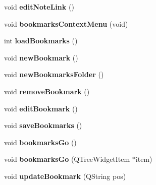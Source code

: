 \begin{CompactItemize}
\item 
\hypertarget{classMainWindow_c3c2f71fe7236fde6c66a2a17a0f436f}{
void \textbf{editNoteLink} ()}
\label{classMainWindow_c3c2f71fe7236fde6c66a2a17a0f436f}

\item 
\hypertarget{classMainWindow_15c3b4f714a9c23fd2482a256005da8e}{
void \textbf{bookmarksContextMenu} (void)}
\label{classMainWindow_15c3b4f714a9c23fd2482a256005da8e}

\item 
\hypertarget{classMainWindow_0ef5dfef86411bcec1be0a3bca710868}{
int \textbf{loadBookmarks} ()}
\label{classMainWindow_0ef5dfef86411bcec1be0a3bca710868}

\item 
\hypertarget{classMainWindow_db2f9dff1d3282e1e1fcdb17bfe773fa}{
void \textbf{newBookmark} ()}
\label{classMainWindow_db2f9dff1d3282e1e1fcdb17bfe773fa}

\item 
\hypertarget{classMainWindow_1e055eddbbaf3b67ad9a0fd19f11cf60}{
void \textbf{newBookmarksFolder} ()}
\label{classMainWindow_1e055eddbbaf3b67ad9a0fd19f11cf60}

\item 
\hypertarget{classMainWindow_c6f9c0e9ccfbad14d6daa68ec9521430}{
void \textbf{removeBookmark} ()}
\label{classMainWindow_c6f9c0e9ccfbad14d6daa68ec9521430}

\item 
\hypertarget{classMainWindow_772698c4d48a78e2467808cee064f140}{
void \textbf{editBookmark} ()}
\label{classMainWindow_772698c4d48a78e2467808cee064f140}

\item 
\hypertarget{classMainWindow_2025cf0a06119f314750a614588cfcfe}{
void \textbf{saveBookmarks} ()}
\label{classMainWindow_2025cf0a06119f314750a614588cfcfe}

\item 
\hypertarget{classMainWindow_ea41856414f77fce674bcd4970357ef7}{
void \textbf{bookmarksGo} ()}
\label{classMainWindow_ea41856414f77fce674bcd4970357ef7}

\item 
\hypertarget{classMainWindow_8856bd489b09ffccc39472deace51032}{
void \textbf{bookmarksGo} (QTreeWidgetItem $\ast$item)}
\label{classMainWindow_8856bd489b09ffccc39472deace51032}

\item 
\hypertarget{classMainWindow_f662e0ce912f4db8ed414aeeb064be26}{
void \textbf{updateBookmark} (QString pos)}
\label{classMainWindow_f662e0ce912f4db8ed414aeeb064be26}


\end{CompactItemize}
